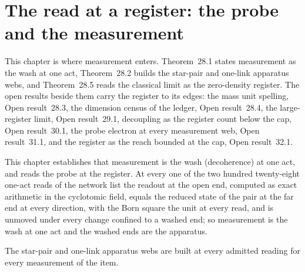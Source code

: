 \section{The read at a register: the probe and the measurement}\label{mod:I-6-read-at-a-register-the-probe-and-the-measurement}
\label{narr:open:1-6}This chapter is where measurement enters. Theorem~28.1 states measurement as the wash at one act, Theorem~28.2 builds the star-pair and one-link apparatus webs, and Theorem~28.5 reads the classical limit as the zero-density register. The open results beside them carry the register to its edges: the mass unit spelling, Open result~28.3, the dimension census of the ledger, Open result~28.4, the large-register limit, Open result~29.1, decoupling as the register count below the cap, Open result~30.1, the probe electron at every measurement web, Open result~31.1, and the register as the reach bounded at the cap, Open result~32.1.
\begin{chtheorem}\label{box:I-6-read-at-a-register-the-probe-and-the-measurement:1}
This chapter establishes that measurement is the wash (decoherence) at one act, and reads the probe at the register. At every one of the two hundred twenty-eight one-act reads of the network list the readout at the open end, computed as exact arithmetic in the cyclotomic field, equals the reduced state of the pair at the far end at every direction, with the Born square the unit at every read, and is unmoved under every change confined to a washed end; so measurement is the wash at one act and the washed ends are the apparatus.
\end{chtheorem}
\begin{chtheorem}\label{box:I-6-read-at-a-register-the-probe-and-the-measurement:2}
The star-pair and one-link apparatus webs are built at every admitted reading for every measurement of the item.
\end{chtheorem}
